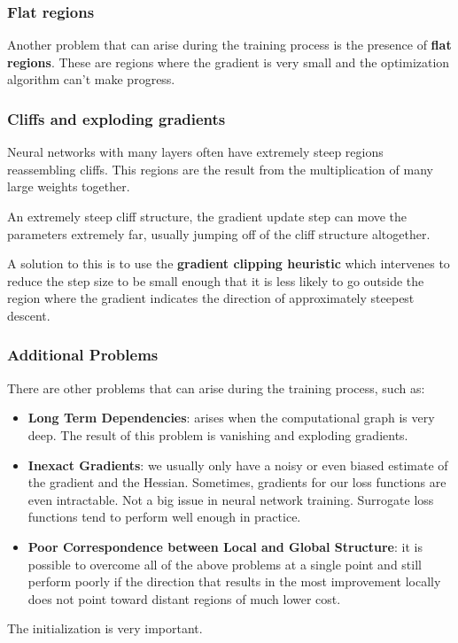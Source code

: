 \subsubsection{Flat regions}
Another problem that can arise during the training process is the presence of
\textbf{flat regions}. These are regions where the gradient is very small and the
optimization algorithm can't make progress.
\subsubsection{Cliffs and exploding gradients}
Neural networks with many layers often have extremely steep regions reassembling
cliffs. This regions are the result from the multiplication of many large weights
together.

An extremely steep cliff structure, the gradient update step can move the
parameters extremely far, usually jumping off of the cliff structure altogether.

A solution to this is to use the \textbf{gradient clipping heuristic} which
intervenes to reduce the step size to be small enough that it is less likely to
go outside the region where the gradient indicates the direction of approximately
steepest descent.
\subsubsection{Additional Problems}
There are other problems that can arise during the training process, such as:
\begin{itemize}
    \item \textbf{Long Term Dependencies}: arises when the computational graph
          is very deep. The result of this problem is vanishing and exploding
          gradients.
    \item \textbf{Inexact Gradients}: we usually only have a noisy or even biased
          estimate of the gradient and the Hessian. Sometimes, gradients for our
          loss functions are even intractable. Not a big issue in neural network
          training. Surrogate loss functions tend to perform well enough in practice.
    \item \textbf{Poor Correspondence between Local and Global Structure}: it is
          possible to overcome all of the above problems at a single point and
          still perform poorly if the direction that results in the most
          improvement locally does not point toward distant regions of much
          lower cost.
\end{itemize}
\begin{note}
    The initialization is very important.
\end{note}
